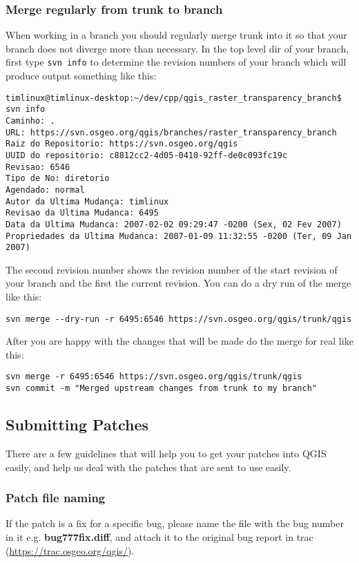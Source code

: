 \subsubsection{Merge regularly from trunk to branch}
When working in a branch you should regularly merge trunk into it so that your
branch does not diverge more than necessary. In the top level dir of your
branch, first type \texttt{svn info} to determine the revision numbers of your
branch which will produce output something like this:

\begin{verbatim}
timlinux@timlinux-desktop:~/dev/cpp/qgis_raster_transparency_branch$ svn info
Caminho: .
URL: https://svn.osgeo.org/qgis/branches/raster_transparency_branch
Raiz do Repositorio: https://svn.osgeo.org/qgis
UUID do repositorio: c8812cc2-4d05-0410-92ff-de0c093fc19c
Revisao: 6546
Tipo de No: diretorio
Agendado: normal
Autor da Ultima Mudança: timlinux
Revisao da Ultima Mudanca: 6495
Data da Ultima Mudanca: 2007-02-02 09:29:47 -0200 (Sex, 02 Fev 2007)
Propriedades da Ultima Mudanca: 2007-01-09 11:32:55 -0200 (Ter, 09 Jan 2007)
\end{verbatim}

The second revision number shows the revision number of the start revision of
your branch and the first the current revision. You can do a dry run of the
merge like this:

\begin{verbatim}
svn merge --dry-run -r 6495:6546 https://svn.osgeo.org/qgis/trunk/qgis
\end{verbatim}

After you are happy with the changes that will be made do the merge for real
like this:

\begin{verbatim}
svn merge -r 6495:6546 https://svn.osgeo.org/qgis/trunk/qgis
svn commit -m "Merged upstream changes from trunk to my branch"
\end{verbatim}

\subsection{Submitting Patches}
There are a few guidelines that will help you to get your patches into QGIS
easily, and help us deal with the patches that are sent to use easily.

\subsubsection{Patch file naming}
If the patch is a fix for a specific bug, please name the file with the bug
number in it e.g. \textbf{bug777fix.diff}, and attach it to the original bug report
in trac (\url{https://trac.osgeo.org/qgis/}).


